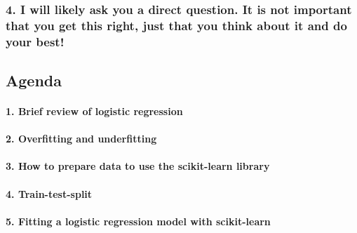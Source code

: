\documentclass[11pt]{article}
\begin{document}
\hypertarget{i-will-likely-ask-you-a-direct-question.-it-is-not-important-that-you-get-this-right-just-that-you-think-about-it-and-do-your-best}{%
\subsubsection{4. I will likely ask you a direct question. It is not
important that you get this right, just that you think about it and do
your
best!}\label{i-will-likely-ask-you-a-direct-question.-it-is-not-important-that-you-get-this-right-just-that-you-think-about-it-and-do-your-best}}

    \hypertarget{agenda}{%
\subsection{Agenda}\label{agenda}}

\hypertarget{brief-review-of-logistic-regression}{%
\paragraph{1. Brief review of logistic
regression}\label{brief-review-of-logistic-regression}}

\hypertarget{overfitting-and-underfitting}{%
\paragraph{2. Overfitting and
underfitting}\label{overfitting-and-underfitting}}

\hypertarget{how-to-prepare-data-to-use-the-scikit-learn-library}{%
\paragraph{3. How to prepare data to use the scikit-learn
library}\label{how-to-prepare-data-to-use-the-scikit-learn-library}}

\hypertarget{train-test-split}{%
\paragraph{4. Train-test-split}\label{train-test-split}}

\hypertarget{fitting-a-logistic-regression-model-with-scikit-learn}{%
\paragraph{5. Fitting a logistic regression model with
scikit-learn}\label{fitting-a-logistic-regression-model-with-scikit-learn}}
\end{document}
